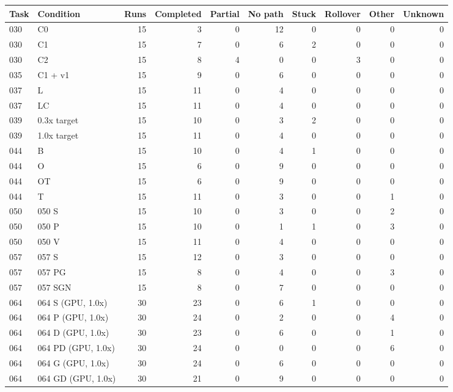 \begin{tabular}{llrrrrrrrr}
\hline
Task & Condition & Runs & Completed & Partial & No path & Stuck & Rollover & Other & Unknown \\
\hline
030 & C0 & 15 & 3 & 0 & 12 & 0 & 0 & 0 & 0 \\
030 & C1 & 15 & 7 & 0 & 6 & 2 & 0 & 0 & 0 \\
030 & C2 & 15 & 8 & 4 & 0 & 0 & 3 & 0 & 0 \\
035 & C1 + v1 & 15 & 9 & 0 & 6 & 0 & 0 & 0 & 0 \\
037 & L & 15 & 11 & 0 & 4 & 0 & 0 & 0 & 0 \\
037 & LC & 15 & 11 & 0 & 4 & 0 & 0 & 0 & 0 \\
039 & 0.3x target & 15 & 10 & 0 & 3 & 2 & 0 & 0 & 0 \\
039 & 1.0x target & 15 & 11 & 0 & 4 & 0 & 0 & 0 & 0 \\
044 & B & 15 & 10 & 0 & 4 & 1 & 0 & 0 & 0 \\
044 & O & 15 & 6 & 0 & 9 & 0 & 0 & 0 & 0 \\
044 & OT & 15 & 6 & 0 & 9 & 0 & 0 & 0 & 0 \\
044 & T & 15 & 11 & 0 & 3 & 0 & 0 & 1 & 0 \\
050 & 050 S & 15 & 10 & 0 & 3 & 0 & 0 & 2 & 0 \\
050 & 050 P & 15 & 10 & 0 & 1 & 1 & 0 & 3 & 0 \\
050 & 050 V & 15 & 11 & 0 & 4 & 0 & 0 & 0 & 0 \\
057 & 057 S & 15 & 12 & 0 & 3 & 0 & 0 & 0 & 0 \\
057 & 057 PG & 15 & 8 & 0 & 4 & 0 & 0 & 3 & 0 \\
057 & 057 SGN & 15 & 8 & 0 & 7 & 0 & 0 & 0 & 0 \\
064 & 064 S (GPU, 1.0x) & 30 & 23 & 0 & 6 & 1 & 0 & 0 & 0 \\
064 & 064 P (GPU, 1.0x) & 30 & 24 & 0 & 2 & 0 & 0 & 4 & 0 \\
064 & 064 D (GPU, 1.0x) & 30 & 23 & 0 & 6 & 0 & 0 & 1 & 0 \\
064 & 064 PD (GPU, 1.0x) & 30 & 24 & 0 & 0 & 0 & 0 & 6 & 0 \\
064 & 064 G (GPU, 1.0x) & 30 & 24 & 0 & 6 & 0 & 0 & 0 & 0 \\
064 & 064 GD (GPU, 1.0x) & 30 & 21 & 0 & 9 & 0 & 0 & 0 & 0 \\
\hline
\end{tabular}
